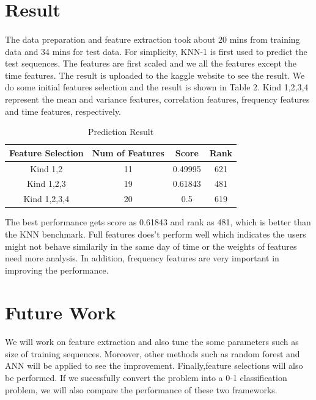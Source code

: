 \documentclass{article}
\begin{document}
	\section{Result} %
	\label{sec:result}
	\paragraph{} The data preparation and feature extraction took about 20 mins from training data and 34 mins for test data. For simplicity, KNN-1 is first used to predict the test sequences. The features are first scaled and we all the features except the time features. The result is uploaded to the kaggle website to see the result. We do some initial features selection and the result is shown in Table 2. Kind 1,2,3,4 represent the mean and variance features, correlation features, frequency features and time features, respectively.
	\begin{table}
		\centering
		\caption{Prediction Result}
		\begin{tabular}{c|c|c|c}
			Feature Selection & Num of Features & Score & Rank \\ \hline
			Kind 1,2 & 11 & 0.49995 & 621 \\ 
			Kind 1,2,3 & 19 & 0.61843 & 481 \\ 
			Kind 1,2,3,4 & 20 & 0.5 & 619 \\
		\end{tabular}
	\end{table}
	The best performance gets score as 0.61843 and rank as 481, which is better than the KNN benchmark. Full features does't perform well which indicates the users might not behave similarily in the same day of time or the weights of features need more analysis. In addition, frequency features are very important in improving the performance. 
	
	
	\section{Future Work} %
	\label{sec:future_work}
	\paragraph{} We will work on feature extraction and also tune the some parameters such as size of training sequences. Moreover, other methods such as random forest and ANN will be applied to see the improvement. Finally,feature selections will also be performed. If we sucessfully convert the problem into a 0-1 classification problem, we will also compare the performance of these two frameworks.
	
\end{document}
